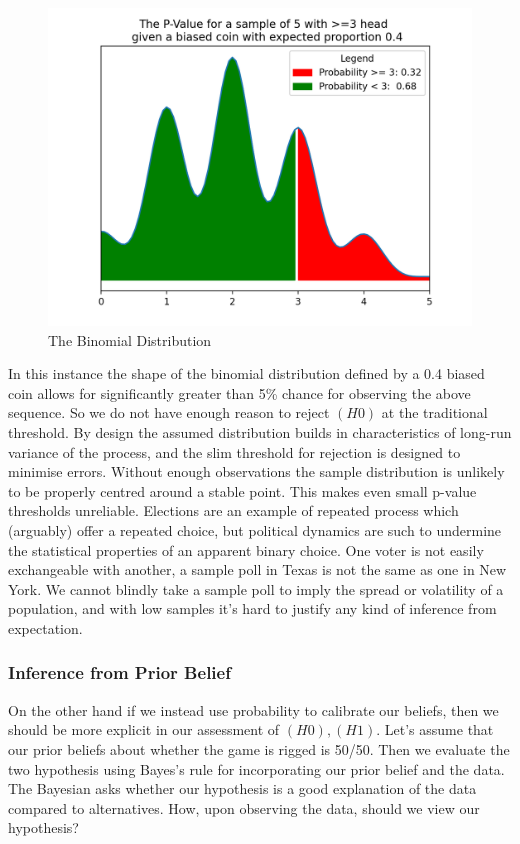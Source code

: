 \documentclass[10pt,a4paper,notitlepage, twocolumn]{article}
\begin{document}
\begin{figure}[H]
  \includegraphics[width=\linewidth]{./Plots/binomial_test.png}
  \caption{The Binomial Distribution}
\end{figure}

In this instance the shape of the binomial distribution defined by a 0.4 biased coin allows for significantly greater than  5\% chance for observing the above sequence. So we do not have enough reason to reject $(H0)$ at the traditional threshold. By design the assumed distribution builds in characteristics of long-run variance of the process, and the slim threshold for rejection is designed to minimise errors. Without enough observations the sample distribution is unlikely to be properly centred around a stable point. This makes even small p-value thresholds unreliable. Elections are an example of repeated process which (arguably) offer a repeated choice, but political dynamics are such to undermine the statistical properties of an apparent binary choice. One voter is not easily exchangeable with another, a sample poll in Texas is not the same as one in New York. We cannot blindly take a sample poll to imply the spread or volatility of a population, and with low samples it's hard to justify any kind of inference from expectation.

\subsubsection*{Inference from Prior Belief}
On the other hand if we instead use probability to calibrate our beliefs, then we should be more explicit in our assessment of $(H0), (H1)$. Let's assume that our prior beliefs about whether the game is rigged is 50/50. Then we evaluate the two hypothesis using Bayes's rule for incorporating our prior belief and the data. The Bayesian asks whether our hypothesis is a good explanation of the data compared to alternatives. How, upon observing the data, should we view our hypothesis?
\end{document}
